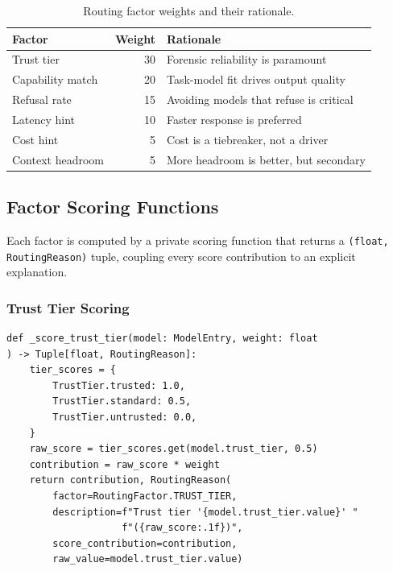 \documentclass[11pt,a4paper]{article}
\theoremstyle{plain}
\theoremstyle{definition}
\begin{document}
\begin{table}[H]
\centering
\caption{Routing factor weights and their rationale.}
\label{tab:weights}
\begin{tabular}{lrl}
\toprule
\textbf{Factor} & \textbf{Weight} & \textbf{Rationale} \\
\midrule
Trust tier          & 30 & Forensic reliability is paramount \\
Capability match    & 20 & Task-model fit drives output quality \\
Refusal rate        & 15 & Avoiding models that refuse is critical \\
Latency hint        & 10 & Faster response is preferred \\
Cost hint           &  5 & Cost is a tiebreaker, not a driver \\
Context headroom    &  5 & More headroom is better, but secondary \\
\bottomrule
\end{tabular}
\end{table}

\subsection{Factor Scoring Functions}

Each factor is computed by a private scoring function that returns a
\texttt{(float, RoutingReason)} tuple, coupling every score contribution to an
explicit explanation.

\subsubsection{Trust Tier Scoring}

\begin{lstlisting}[style=pythonstyle, caption={Trust tier scoring from \texttt{routing.py}}]
def _score_trust_tier(model: ModelEntry, weight: float
) -> Tuple[float, RoutingReason]:
    tier_scores = {
        TrustTier.trusted: 1.0,
        TrustTier.standard: 0.5,
        TrustTier.untrusted: 0.0,
    }
    raw_score = tier_scores.get(model.trust_tier, 0.5)
    contribution = raw_score * weight
    return contribution, RoutingReason(
        factor=RoutingFactor.TRUST_TIER,
        description=f"Trust tier '{model.trust_tier.value}' "
                    f"({raw_score:.1f})",
        score_contribution=contribution,
        raw_value=model.trust_tier.value)
\end{lstlisting}
\end{document}
